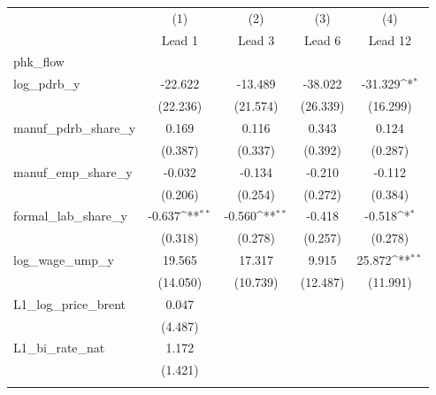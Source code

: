 {
\def\sym#1{\ifmmode^{#1}\else\(^{#1}\)\fi}
\begin{tabular}{l*{4}{c}}
\toprule
                &\multicolumn{1}{c}{(1)}&\multicolumn{1}{c}{(2)}&\multicolumn{1}{c}{(3)}&\multicolumn{1}{c}{(4)}\\
                &\multicolumn{1}{c}{Lead 1}&\multicolumn{1}{c}{Lead 3}&\multicolumn{1}{c}{Lead 6}&\multicolumn{1}{c}{Lead 12}\\
\midrule
phk\_flow        &                  &                  &                  &                  \\
log\_pdrb\_y      &  -22.622         &  -13.489         &  -38.022         &  -31.329\sym{*}  \\
                & (22.236)         & (21.574)         & (26.339)         & (16.299)         \\
\addlinespace
manuf\_pdrb\_share\_y&    0.169         &    0.116         &    0.343         &    0.124         \\
                &  (0.387)         &  (0.337)         &  (0.392)         &  (0.287)         \\
\addlinespace
manuf\_emp\_share\_y&   -0.032         &   -0.134         &   -0.210         &   -0.112         \\
                &  (0.206)         &  (0.254)         &  (0.272)         &  (0.384)         \\
\addlinespace
formal\_lab\_share\_y&   -0.637\sym{**} &   -0.560\sym{**} &   -0.418         &   -0.518\sym{*}  \\
                &  (0.318)         &  (0.278)         &  (0.257)         &  (0.278)         \\
\addlinespace
log\_wage\_ump\_y  &   19.565         &   17.317         &    9.915         &   25.872\sym{**} \\
                & (14.050)         & (10.739)         & (12.487)         & (11.991)         \\
\addlinespace
L1\_log\_price\_brent&    0.047         &                  &                  &                  \\
                &  (4.487)         &                  &                  &                  \\
\addlinespace
L1\_bi\_rate\_nat  &    1.172         &                  &                  &                  \\
                &  (1.421)         &                  &                  &                  \\
\addlinespace

\end{tabular}}
